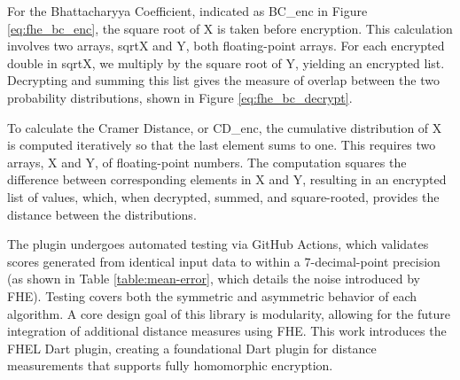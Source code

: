 



For the Bhattacharyya Coefficient, indicated as BC\_enc in Figure \ref{eq:fhe_bc_enc}, the square root of X is taken before encryption. This calculation involves two arrays, sqrtX and Y, both floating-point arrays. For each encrypted double in sqrtX, we multiply by the square root of Y, yielding an encrypted list. Decrypting and summing this list gives the measure of overlap between the two probability distributions, shown in Figure \ref{eq:fhe_bc_decrypt}.





To calculate the Cramer Distance, or CD\_enc, the cumulative distribution of X is computed iteratively so that the last element sums to one. This requires two arrays, X and Y, of floating-point numbers. The computation squares the difference between corresponding elements in X and Y, resulting in an encrypted list of values, which, when decrypted, summed, and square-rooted, provides the distance between the distributions.





The plugin undergoes automated testing via GitHub Actions, which validates scores generated from identical input data to within a 7-decimal-point precision (as shown in Table \ref{table:mean-error}, which details the noise introduced by FHE). Testing covers both the symmetric and asymmetric behavior of each algorithm. A core design goal of this library is modularity, allowing for the future integration of additional distance measures using FHE. This work introduces the FHEL Dart plugin, creating a foundational Dart plugin for distance measurements that supports fully homomorphic encryption.
